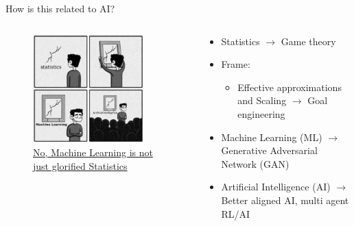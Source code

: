 \documentclass{beamer}
\theoremstyle{definition}
\begin{document}
\begin{frame}{How is this related to AI?}

    \begin{columns}

\begin{column}{0.5\textwidth}
    \begin{figure}
    \centering
        \includegraphics[width=0.85\textwidth]{img/MachineLearningMeme.jpg}
        \caption{\small \centering  \href{https://towardsdatascience.com/no-machine-learning-is-not-just-glorified-statistics-26d3952234e3}{No, Machine Learning is not just glorified Statistics}}
    \end{figure}
\end{column}

        \begin{column}{0.5\textwidth}
            \begin{itemize}
    \item Statistics $\to$ Game theory
    \item Frame: 
    \begin{itemize}
        \item Effective approximations and Scaling $\to$ Goal engineering
    \end{itemize}
    \item Machine Learning (ML) $\to$ Generative Adversarial Network (GAN)
    \item Artificial Intelligence (AI) $\to$ Better aligned AI, multi agent RL/AI 
\end{itemize}
        \end{column}

\end{columns}
\end{frame}
\end{document}
